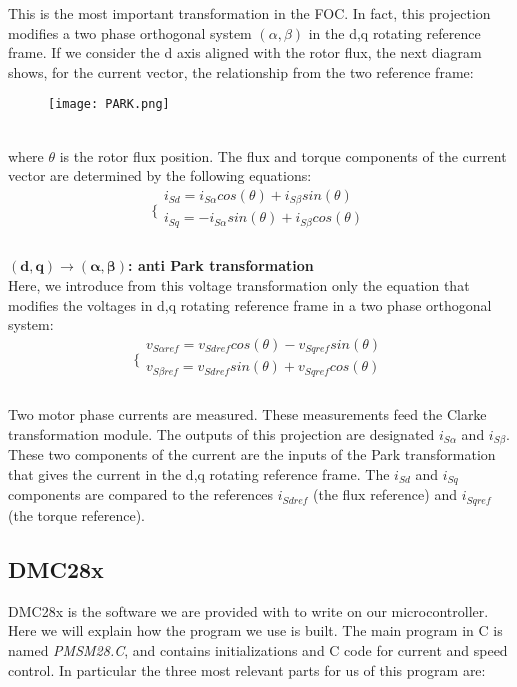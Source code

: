 \documentclass[12pt]{article}
\begin{document}
This is the most important transformation in the FOC. In fact, this projection modifies a
two phase orthogonal system $(\alpha,\beta)$ in the d,q rotating reference frame. If we consider the
d axis aligned with the rotor flux, the next diagram shows, for the current vector, the
relationship from the two reference frame:
\begin{figure}[h]
\centering
\texttt{[image: PARK.png]}
\end{figure}\\
where $\theta$ is the rotor flux position. The flux and torque components of the current vector
are determined by the following equations:\\
$$\bigg \{
\begin{array}{lr}
i_{Sd} = i_{S\alpha}cos(\theta)+i_{S\beta}sin(\theta)\\
i_{Sq} = -i_{S\alpha}sin(\theta)+i_{S\beta}cos(\theta)\\
\end{array}
$$\\

\textbf{$\boldsymbol{(d,q)\rightarrow (\alpha,\beta)}$: anti Park transformation}\\
Here, we introduce from this voltage transformation only the equation that modifies the
voltages in d,q rotating reference frame in a two phase orthogonal system:\\
$$\bigg \{
\begin{array}{lr}
v_{S\alpha ref} = v_{Sdref}cos(\theta)-v_{Sqref}sin(\theta)\\
v_{S\beta ref} = v_{Sdref}sin(\theta)+v_{Sqref}cos(\theta)\\
\end{array}
$$\\
Two motor phase currents are measured. These measurements feed the Clarke
transformation module. The outputs of this projection are designated $i_{S\alpha}$ and $i_{S\beta}$.\\
These two components of the current are the inputs of the Park transformation that gives the
current in the d,q rotating reference frame. The $i_{Sd}$ and $i_{Sq}$ components are compared to the
references $i_{Sdref}$ (the flux reference) and $i_{Sqref}$ (the torque reference).

\subsection{DMC28x}

DMC28x is the software we are provided with to write on our microcontroller. Here we will explain how the program we use is built. 
The main program in C is named \textit{PMSM28.C}, and contains initializations and C code for current and speed control. 
In particular the three most relevant parts for us of this program are:
\end{document}
